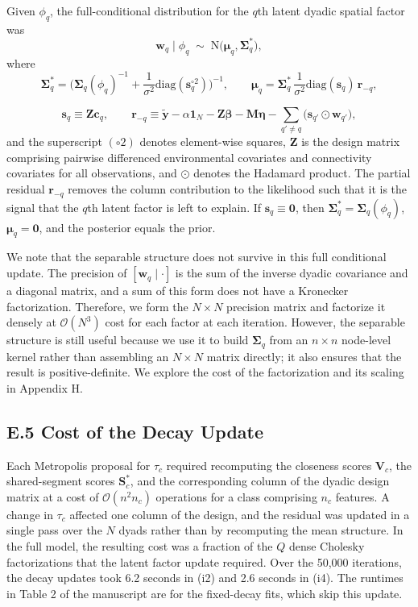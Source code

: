 \documentclass{article}
\begin{document}
Given $\phi_q$, the full-conditional distribution for the $q$th latent dyadic spatial factor was
$$\mathbf{w}_{q}\mid \phi_q \;\sim\; \text{N}\!\big(\boldsymbol{\mu}_{q},\boldsymbol{\Sigma}_{q}^*\big),$$
where
$$\boldsymbol{\Sigma}_{q}^* = \Big(\boldsymbol\Sigma_q(\phi_q)^{-1}+\frac{1}{\sigma^2}\text{diag}(\mathbf{s}_q^{\circ 2})\Big)^{-1}, 
\qquad
\boldsymbol{\mu}_{q} = \boldsymbol{\Sigma}_{q}^*\,\frac{1}{\sigma^2}\text{diag}(\mathbf{s}_q)\,\mathbf{r}_{-q},$$

$$\mathbf{s}_q \equiv \mathbf{Z}\mathbf{c}_{q}, \qquad \mathbf{r}_{-q} \equiv \mathbf{\widetilde{y}}-\alpha\mathbf{1}_N-\mathbf{Z}\boldsymbol{\beta}-\mathbf{M}\boldsymbol{\eta}
-\sum_{q'\neq q}\big(\mathbf{s}_{q'}\odot \mathbf{w}_{q'}\big),$$
and the superscript $({\circ 2})$ denotes element-wise squares, $\mathbf{Z}$ is the design matrix comprising pairwise differenced environmental covariates and connectivity covariates for all observations, and $\odot$ denotes the Hadamard product.
The partial residual $\mathbf{r}_{-q}$ removes the column contribution to the likelihood such that it is the signal that the $q$th latent factor is left to explain.
If $\mathbf{s}_q\equiv \boldsymbol0$, then $\boldsymbol{\Sigma}_{q}^*=\boldsymbol\Sigma_q(\phi_q)$, $\boldsymbol{\mu}_{q}=\boldsymbol0$, and the posterior equals the prior. 

We note that the separable structure does not survive in this full conditional update. The precision of $[\mathbf{w}_q\mid\cdot]$ is the sum of the inverse dyadic covariance and a diagonal matrix, and a sum of this form does not have a Kronecker factorization. Therefore, we form the $N\times N$ precision matrix and factorize it densely at $\mathcal{O}(N^3)$ cost for each factor at each iteration. However, the separable structure is still useful because we use it to build $\boldsymbol{\Sigma}_q$ from an $n\times n$ node-level kernel rather than assembling an $N\times N$ matrix directly; it also ensures that the result is positive-definite. We explore the cost of the factorization and its scaling in Appendix H.

\subsection*{E.5 Cost of the Decay Update}

Each Metropolis proposal for $\tau_c$ required recomputing the closeness scores $\mathbf{V}_c$, the shared-segment scores $\mathbf{S}^*_c$, and the corresponding column of the dyadic design matrix at a cost of $\mathcal{O}(n^2n_c)$ operations for a class comprising $n_c$ features. A change in $\tau_c$ affected one column of the design, and the residual was updated in a single pass over the $N$ dyads rather than by recomputing the mean structure. In the full model, the resulting cost was a fraction of the $Q$ dense Cholesky factorizations that the latent factor update required. Over the 50,000 iterations, the decay updates took 6.2 seconds in (i2) and 2.6 seconds in (i4). The runtimes in Table 2 of the manuscript are for the fixed-decay fits, which skip this update.
\end{document}
